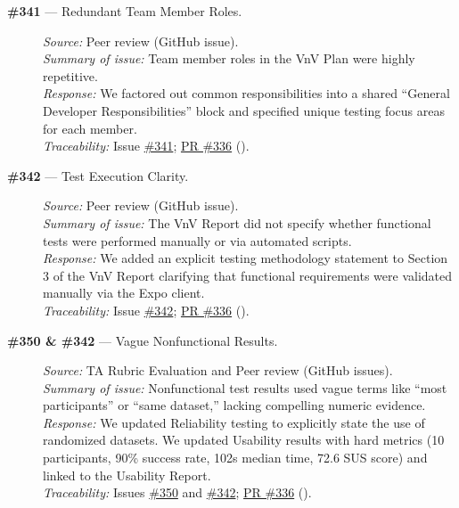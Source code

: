 \documentclass{article}
\begin{document}
\begin{description}
  \item[\textbf{\#341} --- Redundant Team Member Roles.]
  \textit{Source:} Peer review (GitHub issue). \\
  \textit{Summary of issue:} Team member roles in the VnV Plan were highly repetitive. \\
  \textit{Response:} We factored out common responsibilities into a shared ``General Developer Responsibilities'' block and specified unique testing focus areas for each member. \\
  \textit{Traceability:} Issue \href{https://github.com/hitchly/hitchly/issues/341}{\#341}; \href{https://github.com/hitchly/hitchly/pull/336}{PR \#336} ().

  \item[\textbf{\#342} --- Test Execution Clarity.]
  \textit{Source:} Peer review (GitHub issue). \\
  \textit{Summary of issue:} The VnV Report did not specify whether functional tests were performed manually or via automated scripts. \\
  \textit{Response:} We added an explicit testing methodology statement to Section 3 of the VnV Report clarifying that functional requirements were validated manually via the Expo client. \\
  \textit{Traceability:} Issue \href{https://github.com/hitchly/hitchly/issues/342}{\#342}; \href{https://github.com/hitchly/hitchly/pull/336}{PR \#336} ().

  \item[\textbf{\#350 \& \#342} --- Vague Nonfunctional Results.]
  \textit{Source:} TA Rubric Evaluation and Peer review (GitHub issues). \\
  \textit{Summary of issue:} Nonfunctional test results used vague terms like ``most participants'' or ``same dataset,'' lacking compelling numeric evidence. \\
  \textit{Response:} We updated Reliability testing to explicitly state the use of randomized datasets. We updated Usability results with hard metrics (10 participants, 90\% success rate, 102s median time, 72.6 SUS score) and linked to the Usability Report. \\
  \textit{Traceability:} Issues \href{https://github.com/hitchly/hitchly/issues/350}{\#350} and \href{https://github.com/hitchly/hitchly/issues/342}{\#342}; \href{https://github.com/hitchly/hitchly/pull/336}{PR \#336} ().


\end{description}
\end{document}
